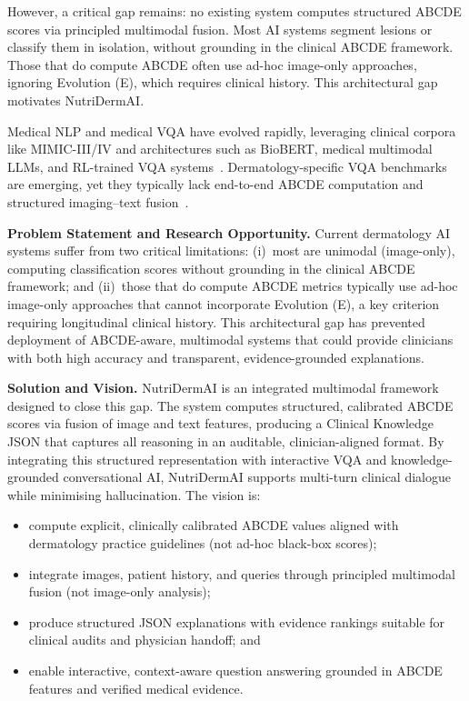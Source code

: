 \documentclass[conference]{IEEEtran}
\begin{document}
However, a critical gap remains: no existing system computes structured
ABCDE scores via principled multimodal fusion. Most AI systems segment
lesions or classify them in isolation, without grounding in the clinical
ABCDE framework. Those that do compute ABCDE often use ad-hoc image-only
approaches, ignoring Evolution (E), which requires clinical history.
This architectural gap motivates NutriDermAI.

Medical NLP and medical VQA have evolved rapidly, leveraging clinical
corpora like MIMIC-III/IV and architectures such as BioBERT, medical
multimodal LLMs, and RL-trained VQA
systems~\cite{lee2020_biobert,johnson2016_mimic3,hyland2023_mimic4note,
clinicaltextreview2020t,biomedblip2024_naseem,li2022_semantic_vqa,
dsap2024_dynamic_prompting,medvlmr12025,rlvalidation2023_vqa,
medthink2025,medicalmmllmreview2024}. Dermatology-specific VQA
benchmarks are emerging, yet they typically lack end-to-end ABCDE
computation and structured imaging--text
fusion~\cite{he2020_pathvqa,lau2018_vqarad,yim2024_dermavqa,
healmqa2024,faggioli2025_multimodal_sls_vqa,irel2025_clipseg,
dermatologychatbot2024,casestudy2024_wizard_of_oz,chatgptderm2025,
amie2025,convagents2025_effectiveness}.

\textbf{Problem Statement and Research Opportunity.} Current
dermatology AI systems suffer from two critical limitations: (i)~most
are unimodal (image-only), computing classification scores without
grounding in the clinical ABCDE framework; and (ii)~those that do
compute ABCDE metrics typically use ad-hoc image-only approaches that
cannot incorporate Evolution (E), a key criterion requiring longitudinal
clinical history. This architectural gap has prevented deployment of
ABCDE-aware, multimodal systems that could provide clinicians with both
high accuracy and transparent, evidence-grounded explanations.

\textbf{Solution and Vision.} NutriDermAI is an integrated multimodal
framework designed to close this gap. The system computes structured,
calibrated ABCDE scores via fusion of image and text features,
producing a Clinical Knowledge JSON that captures all reasoning in an
auditable, clinician-aligned format. By integrating this structured
representation with interactive VQA and knowledge-grounded conversational
AI, NutriDermAI supports multi-turn clinical dialogue while minimising
hallucination. The vision is:
\begin{itemize}[leftmargin=*]
    \item compute explicit, clinically calibrated ABCDE values aligned with 
          dermatology practice guidelines (not ad-hoc black-box scores);
    \item integrate images, patient history, and queries through principled 
          multimodal fusion (not image-only analysis);
    \item produce structured JSON explanations with evidence rankings suitable 
          for clinical audits and physician handoff; and
    \item enable interactive, context-aware question answering grounded in 
          ABCDE features and verified medical evidence.
\end{itemize}
\end{document}
